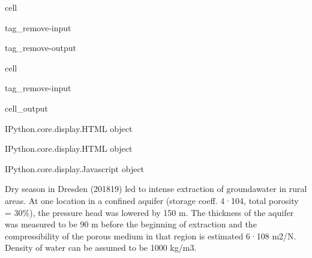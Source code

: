 \documentclass[letterpaper,10pt,english]{jupyterBook}
\begin{document}
\begin{sphinxuseclass}{cell}
\begin{sphinxuseclass}{tag_remove-input}
\begin{sphinxuseclass}{tag_remove-output}
\end{sphinxuseclass}
\end{sphinxuseclass}
\end{sphinxuseclass}
\begin{sphinxuseclass}{cell}
\begin{sphinxuseclass}{tag_remove-input}\begin{sphinxVerbatimOutput}

\begin{sphinxuseclass}{cell_output}
\begin{sphinxVerbatim}[commandchars=\\\{\}]

\end{sphinxVerbatim}

\begin{sphinxVerbatim}[commandchars=\\\{\}]
\PYGZlt{}IPython.core.display.HTML object\PYGZgt{}
\end{sphinxVerbatim}

\begin{sphinxVerbatim}[commandchars=\\\{\}]
\PYGZlt{}IPython.core.display.HTML object\PYGZgt{}
\end{sphinxVerbatim}

\begin{sphinxVerbatim}[commandchars=\\\{\}]
\PYGZlt{}IPython.core.display.Javascript object\PYGZgt{}
\end{sphinxVerbatim}

\end{sphinxuseclass}\end{sphinxVerbatimOutput}

\end{sphinxuseclass}
\end{sphinxuseclass}
\sphinxAtStartPar
{}

\sphinxAtStartPar
Dry season in Dresden (2018\sphinxhyphen{}19) led to intense extraction of groundawater in rural areas. At one location in a confined aquifer (storage coeff. 4·10\sphinxhyphen{}4, total porosity = 30\%),  the pressure head was lowered by 150 m. The thickness of the aquifer was measured to be 90 m before the beginning of extraction and the compressibility of the porous medium in that region is estimated 6·10\sphinxhyphen{}8 m2/N. Density of water can be assumed to be 1000 kg/m3.
\end{document}
